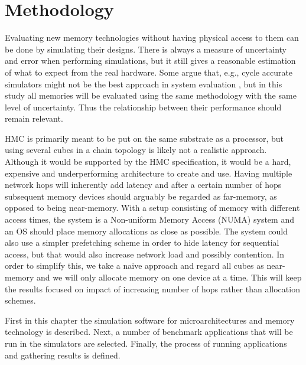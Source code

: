 \chapter{Methodology} \label{method}
Evaluating new memory technologies without having physical access to them can be done by simulating their designs. There is always a measure of uncertainty and error when performing simulations, but it still gives a reasonable estimation of what to expect from the real hardware. Some argue that, e.g., cycle accurate simulators might not be the best approach in system evaluation \cite{weaver2008cycle}, but in this study all memories will be evaluated  using the same methodology with the same level of uncertainty. Thus the relationship between their performance should remain relevant. 
\bigskip

HMC is primarily meant to be put on the same substrate as a processor, but using several cubes in a chain topology is likely not a realistic approach. Although it would be supported by the HMC specification, it would be a hard, expensive and underperforming architecture to create and use. Having multiple network hops will inherently add latency and after a certain number of hops subsequent memory devices should arguably be regarded as far-memory, as opposed to being near-memory. With a setup consisting of memory with different access times, the system is a Non-uniform Memory Access (NUMA) system and an OS should place memory allocations as close as possible. The system could also use a simpler prefetching scheme in order to hide latency for sequential access, but that would also increase network load and possibly contention. In order to simplify this, we take a naive approach and regard all cubes as near-memory and we will only allocate memory on one device at a time. This will keep the results focused on impact of increasing number of hops rather than allocation schemes.
\bigskip

First in this chapter the simulation software for microarchitectures and memory technology is described. Next, a number of benchmark applications that will be run in the simulators are selected. Finally, the process of running applications and gathering results is defined.



